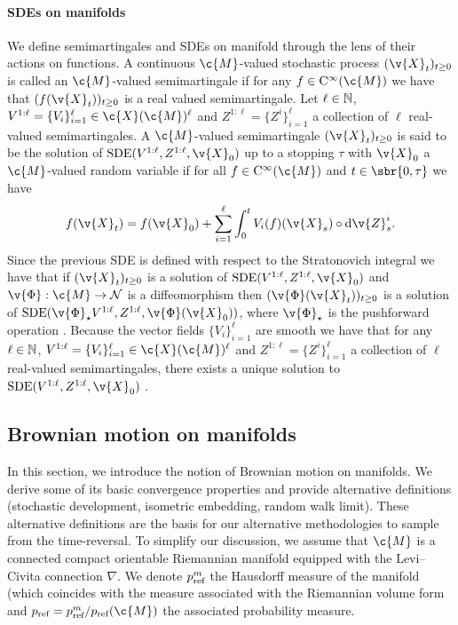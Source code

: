 \paragraph{SDEs on manifolds}
We define semimartingales and SDEs on manifold through the lens of their actions on functions.
A continuous \(\c{M}\)-valued stochastic process \((\v{X}_t)_{t \geq 0}\) is called an \(\c{M}\)-valued semimartingale if for any \(f \in \mathrm{C}^\infty(\c{M})\) we have that \((f(\v{X}_t))_{t \geq 0}\) is a real valued semimartingale.
Let \(\ell \in \mathbb{N}\), \(V^{1:\ell} = \{ V_i\}_{i=1}^\ell \in \c{X}(\c{M})^\ell\) and \(Z^{1:\ell} = \{Z^i\}_{i=1}^\ell\) a collection of \(\ell\) real-valued semimartingales.
A \(\c{M}\)-valued semimartingale \((\v{X}_t)_{t \geq 0}\) is said to be the solution of \(\mathrm{SDE}(V^{1:\ell}, Z^{1:\ell}, \v{X}_0)\) up to a stopping \(\tau\) with \(\v{X}_0\) a \(\c{M}\)-valued random variable if for all \(f \in \mathrm{C}^\infty(\c{M})\) and \(t \in \sbr{0, \tau}\) we have \begin{equation} {f(\v{X}_t) = f(\v{X}_0) + \sum_{i=1}^\ell \int_0^t V_i(f)(\v{X}_s) \circ \mathrm{d} \v{Z}^i_s .
	}
\end{equation}
Since the previous SDE is defined with respect to the Stratonovich integral we have that if \((\v{X}_t)_{t \geq 0}\) is a solution of \(\mathrm{SDE}(V^{1:\ell}, Z^{1:\ell}, \v{X}_0)\) and \(\v{\Phi}: \c{M} \to \mathcal{N}\) is a diffeomorphism then \((\v{\Phi}(\v{X}_t))_{t \geq 0}\) is a solution of \(\mathrm{SDE}(\v{\Phi}_\star V^{1:\ell}, Z^{1:\ell}, \v{\Phi}(\v{X}_0))\), where \(\v{\Phi}_\star\) is the pushforward operation \cite[see][Proposition 1.2.4]{hsu2002stochastic}.
Because the vector fields \(\{V_i\}_{i=1}^\ell\) are smooth we have that for any \(\ell \in \mathbb{N}\), \(V^{1:\ell} = \{ V_i\}_{i=1}^\ell \in \c{X}(\c{M})^\ell\) and \(Z^{1:\ell} = \{Z^i\}_{i=1}^\ell\) a collection of \(\ell\) real-valued semimartingales, there exists a unique solution to \(\mathrm{SDE}(V^{1:\ell}, Z^{1:\ell}, \v{X}_0)\) \cite[see][Theorem 1.2.9]{hsu2002stochastic}.

\subsection{Brownian motion on manifolds}
\label{sec:brown-moti-manif}

In this section, we introduce the notion of Brownian motion on manifolds.
We derive some of its basic convergence properties and provide alternative definitions (stochastic development, isometric embedding, random walk limit).
These alternative definitions are the basis for our alternative methodologies to sample from the time-reversal.
To simplify our discussion, we assume that \(\c{M}\) is a connected compact orientable Riemannian manifold equipped with the Levi--Civita connection \(\nabla\).
We denote \(p_{\textup{ref}}^m\) the Hausdorff measure of the manifold (which coincides with the measure associated with the Riemannian volume form \parencite[see][Theorem 2.10.10]{federer2014geometric} and \(p_{\textup{ref}} = p_{\textup{ref}}^m / p_{\textup{ref}}(\c{M})\) the associated probability measure.

